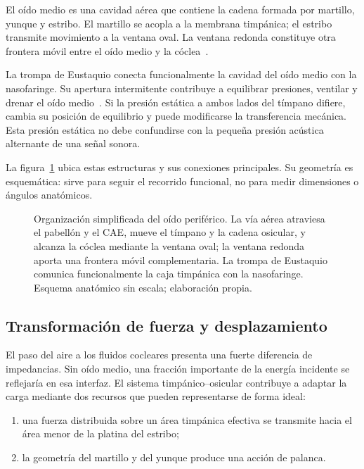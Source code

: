 El oído medio es una cavidad aérea que contiene la cadena formada por
martillo, yunque y estribo. El martillo se acopla a la membrana timpánica; el
estribo transmite movimiento a la ventana oval. La ventana redonda constituye
otra frontera móvil entre el oído medio y la cóclea~\cite{ugarteburu2022}.

La trompa de Eustaquio conecta funcionalmente la cavidad del oído
medio con la nasofaringe. Su apertura intermitente contribuye a equilibrar
presiones, ventilar y drenar el oído medio~\cite{schilder2015}. Si la presión estática a ambos
lados del tímpano difiere, cambia su posición de equilibrio y puede
modificarse la transferencia mecánica. Esta presión estática no debe
confundirse con la pequeña presión acústica alternante de una señal sonora.

La figura~\ref{fig:u6-organizacion-oido-periferico} ubica estas estructuras y
sus conexiones principales. Su geometría es esquemática: sirve para seguir el
recorrido funcional, no para medir dimensiones o ángulos anatómicos.

\begin{figure}[htbp]
    \centering
    
    \caption{Organización simplificada del oído periférico. La vía aérea
    atraviesa el pabellón y el CAE, mueve el tímpano y la cadena osicular, y
    alcanza la cóclea mediante la ventana oval; la ventana redonda aporta una
    frontera móvil complementaria. La trompa de Eustaquio comunica
    funcionalmente la caja timpánica con la nasofaringe. Esquema anatómico sin
    escala; elaboración propia.}
    \label{fig:u6-organizacion-oido-periferico}
\end{figure}

\subsection{Transformación de fuerza y desplazamiento}
\label{sec:u6-transformacion-oido-medio}

El paso del aire a los fluidos cocleares presenta una fuerte diferencia de
impedancias. Sin oído medio, una fracción importante de la energía incidente
se reflejaría en esa interfaz. El sistema timpánico--osicular contribuye a
adaptar la carga mediante dos recursos que pueden representarse de forma
ideal:

\begin{enumerate}
    \item una fuerza distribuida sobre un área timpánica efectiva se transmite
    hacia el área menor de la platina del estribo;
    \item la geometría del martillo y del yunque produce una acción de
    palanca.
\end{enumerate}


